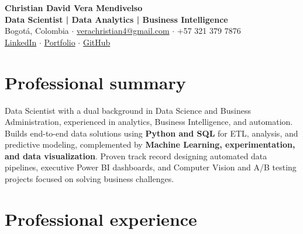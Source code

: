 \documentclass[letterpaper,10pt]{article}
\begin{document}
\begin{center}
    {\Huge \textbf{Christian David Vera Mendivelso}} \\[2.5pt]
    {\large \textbf{\color{sectioncolor}Data Scientist | Data Analytics | Business Intelligence}} \\[3.5pt]
    Bogotá, Colombia \hspace{4pt}$\cdot$\hspace{4pt} \href{mailto:verachristian4@gmail.com}{verachristian4@gmail.com} \hspace{4pt}$\cdot$\hspace{4pt} +57 321 379 7876 \\
    \href{https://www.linkedin.com/in/christianveram/}{LinkedIn} \hspace{4pt}$\cdot$\hspace{4pt}
    \href{https://cveram96.github.io/Portfolio/}{Portfolio} \hspace{4pt}$\cdot$\hspace{4pt}
    \href{https://github.com/cveram96}{GitHub}
\end{center}

\vspace{-0.15cm}

\section*{Professional summary}
Data Scientist with a dual background in Data Science and Business Administration, experienced in analytics, Business Intelligence, and automation. Builds end-to-end data solutions using \textbf{Python and SQL} for ETL, analysis, and predictive modeling, complemented by \textbf{Machine Learning, experimentation, and data visualization}. Proven track record designing automated data pipelines, executive Power BI dashboards, and Computer Vision and A/B testing projects focused on solving business challenges.

\section*{Professional experience}
\end{document}
